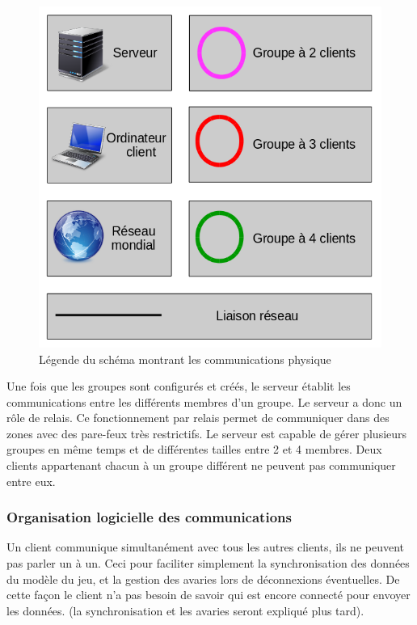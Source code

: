 \documentclass[a4paper,11pt]{report}
\begin{document}
   \begin{figure}[th]
      \begin{center}
        \includegraphics[scale=0.2]{Assets/l_r_1.png}
        \caption{Légende du schéma montrant les communications physique}
        \label{leSchémaCom}
      \end{center}
    \end{figure}
    
  
  Une fois que les groupes sont configurés et créés, le serveur établit les communications entre les différents membres d’un groupe. Le serveur a donc un rôle de relais.
Ce fonctionnement par relais permet de communiquer dans des zones avec des pare-feux très restrictifs.
Le serveur est capable de gérer plusieurs groupes en même temps et de différentes tailles entre 2 et 4 membres. Deux clients appartenant chacun à un groupe différent ne peuvent pas communiquer entre eux.

\subsubsection{Organisation logicielle des communications}

  Un client communique simultanément avec tous les autres clients, ils ne peuvent pas parler un à un. 
Ceci pour faciliter simplement la synchronisation des données du modèle du jeu, et la gestion des avaries lors de déconnexions éventuelles. De cette façon le client n’a pas besoin de savoir qui est encore connecté pour envoyer les données. (la synchronisation et les avaries seront expliqué plus tard).
  
\end{document}
